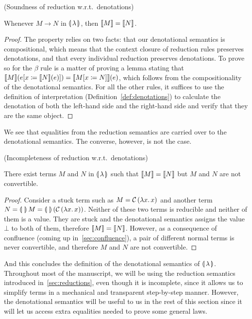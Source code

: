 \begin{observation}\label{obs:denotation-soundness}
  (Soundness of reduction w.r.t.\ denotations)

  Whenever $M \to N$ in $\llparenthesis \, \lambda \, \rrparenthesis$, then $\llbracket M \rrbracket = \llbracket N \rrbracket$.
\end{observation}

\begin{proof}
  The property relies on two facts: that our denotational semantics is
  compositional, which means that the context closure of reduction rules
  preserves denotations, and that every individual reduction preserves
  denotations. To prove so for the $\beta$ rule is a matter of proving a
  lemma stating that
  $\llbracket M \rrbracket(e[x \coloneqq \llbracket N \rrbracket(e)]) = \llbracket M[x \coloneqq N] \rrbracket(e)$, which
  follows from the compositionality of the denotational semantics. For all
  the other rules, it suffices to use the definition of interpretation
  (Definition~\ref{def:denotations}) to calculate the denotation of both
  the left-hand side and the right-hand side and verify that they are the
  same object.
\end{proof}

We see that equalities from the reduction semantics are carried over to the
denotational semantics. The converse, however, is not the case.

\begin{observation}
  (Incompleteness of reduction w.r.t.\ denotations)
  
  There exist terms $M$ and $N$ in $\llparenthesis \, \lambda \, \rrparenthesis$ such that
  $\llbracket M \rrbracket = \llbracket N \rrbracket$ but $M$ and $N$ are not convertible.
\end{observation}

\begin{proof}
  Consider a stuck term such as $M = \mathcal{C}\,(\lambda x.\, x)$ and another
  term $N = \llparenthesis \,  \, \rrparenthesis\,M =
  \llparenthesis \,  \, \rrparenthesis\,(\mathcal{C}\,(\lambda x.\, x))$. Neither of these two terms is
  reducible and neither of them is a value. They are stuck and the
  denotational semantics assigns the value $\bot$ to both of them,
  therefore $\llbracket M \rrbracket = \llbracket N \rrbracket$. However, as a consequence of confluence
  (coming up in~\ref{sec:confluence}), a pair of different normal terms is
  never convertible, and therefore $M$ and $N$ are not convertible.
\end{proof}

And this concludes the definition of the denotational semantics of
$\llparenthesis \, \lambda \, \rrparenthesis$. Throughout most of the manuscript, we will be using the
reduction semantics introduced in~\ref{sec:reductions}, even though it is
incomplete, since it allows us to simplify terms in a mechanical and
transparent step-by-step manner. However, the denotational semantics will
be useful to us in the rest of this section since it will let us access
extra equalities needed to prove some general laws.


